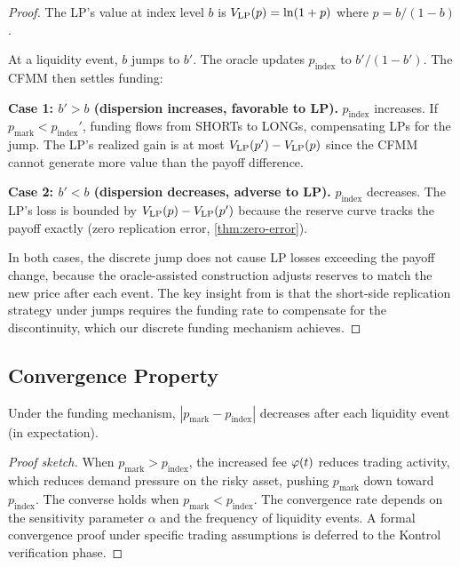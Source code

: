 \begin{proof}
The LP's value at index level $b$ is $V_{\mathrm{LP}}(p) = \ln(1 + p)$ where $p = b/(1-b)$.

At a liquidity event, $b$ jumps to $b'$. The oracle updates $p_{\text{index}}$
to $b'/(1-b')$. The CFMM then settles funding:

\textbf{Case 1: $b' > b$ (dispersion increases, favorable to LP).}
$p_{\text{index}}$ increases. If $p_{\text{mark}} < p_{\text{index}}'$,
funding flows from SHORTs to LONGs, compensating LPs for the jump.
The LP's realized gain is at most $V_{\mathrm{LP}}(p') - V_{\mathrm{LP}}(p)$ since the CFMM
cannot generate more value than the payoff difference.

\textbf{Case 2: $b' < b$ (dispersion decreases, adverse to LP).}
$p_{\text{index}}$ decreases. The LP's loss is bounded by $V_{\mathrm{LP}}(p) - V_{\mathrm{LP}}(p')$
because the reserve curve tracks the payoff exactly (zero replication error,
\cref{thm:zero-error}).

In both cases, the discrete jump does not cause LP losses exceeding the
payoff change, because the oracle-assisted construction adjusts reserves
to match the new price after each event. The key insight from
\cite[Section~3]{angeris2022perpetuals} is that the short-side replication
strategy under jumps requires the funding rate to compensate for the
discontinuity, which our discrete funding mechanism achieves. \qedhere
\end{proof}

\subsection{Convergence Property}

\begin{proposition}\label{prop:convergence}
Under the funding mechanism, $|p_{\text{mark}} - p_{\text{index}}|$ decreases
after each liquidity event (in expectation).
\end{proposition}

\begin{proof}[Proof sketch]
When $p_{\text{mark}} > p_{\text{index}}$, the increased fee $\varphi(t)$ reduces
trading activity, which reduces demand pressure on the risky asset, pushing
$p_{\text{mark}}$ down toward $p_{\text{index}}$. The converse holds when
$p_{\text{mark}} < p_{\text{index}}$. The convergence rate depends on the
sensitivity parameter $\alpha$ and the frequency of liquidity events.
A formal convergence proof under specific trading assumptions is deferred
to the Kontrol verification phase.
\end{proof}
